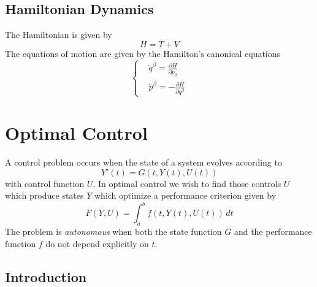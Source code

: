 \documentclass[11pt]{report}
\begin{document}
\section{Hamiltonian Dynamics}

The Hamiltonian is given by
\begin{equation}
	H=T+V
\end{equation}
The equations of motion are given by the Hamilton's canonical equations
\begin{equation}
	\begin{cases}
		&\dot{q}^\beta=\frac{\partial H}{\partial p_\beta}\\
		&\dot{p}^\beta=-\frac{\partial H}{\partial q^\beta}
	\end{cases}
\end{equation}

\chapter{Optimal Control}

A control problem occurs when the state of a system evolves according to
\begin{equation}
	Y'(t)=G(t,Y(t),U(t))
\end{equation}
with control function $U$. In optimal control we wish to find those controls $U$ which produce states $Y$ which optimize a performance criterion given by
\begin{equation}
	F(Y,U)=\int_a^b{f(t,Y(t),U(t))\,dt}
\end{equation}
The problem is \emph{autonomous} when both the state function $G$ and the performance function $f$ do not depend explicitly on $t$.

\section{Introduction}
\end{document}
